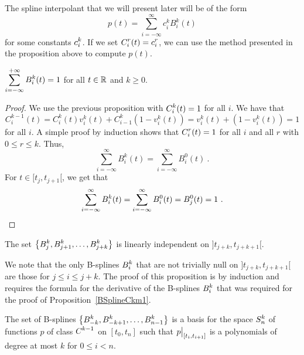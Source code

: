 \begin{rmk}
The spline interpolant that we will present later will be
of the form
\[
  p(t) = \sum_{i=-\infty}^\infty  c_i^k B_i^k(t)
\]
for some constants $\displaystyle c_i^k$.  If we set
$\displaystyle C_i^r(t) = c_i^r$, we can use
the method presented in the proposition above to compute $p(t)$.
\end{rmk}

\begin{prop}
$\displaystyle \sum_{i=-\infty}^{+\infty} B_i^k(t) = 1$ for all $t \in \mathbb{R}$
and $k\geq 0$.
\label{Bsplinesum1}
\end{prop}

\begin{proof}
We use the previous proposition with $\displaystyle C_i^k(t) = 1$ for
all $i$.  We have that
\[
C_i^{k-1}(t) = C_i^k(t) v_i^k(t) + C_{i-1}^k \left( 1- v_i^k(t)\right)
=  v_i^k(t) + \left( 1-  v_i^k(t)\right) = 1
\]
for all $i$.   A simple proof by induction shows that
$\displaystyle C_i^r(t) = 1$ for all $i$ and all $r$ with
$0 \leq r \leq k$.  Thus,
\[
  \sum_{i=-\infty}^\infty B_i^k(t) = \sum_{i=-\infty}^\infty B_i^0(t) \ .
\]
For $t\in [t_j,t_{j+1}[$, we get that
\[
  \sum_{i=-\infty}^\infty B_i^k(t) = \sum_{i=-\infty}^\infty B_i^0(t)
  = B_j^0(t) = 1 \ .  \qedhere
\]
\end{proof}

\begin{prop}
The set
$\displaystyle \left\{ B_j^k, B_{j+1}^k, \ldots , B_{j+k}^k \right\}$
is linearly independent on $]t_{j+k},t_{j+k+1}[$.
\end{prop}

We note that the only B-splines $\displaystyle B_i^k$ that are not
trivially null on $]t_{j+k},t_{j+k+1}[$ are those for
$j \leq i \leq j+k$.  The proof of
this proposition is by induction and requires the formula for the
derivative of the B-splines $\displaystyle B_i^k$ that was required
for the proof of Proposition~\ref{BSplineCkm1}.

\begin{prop}
The set of B-splines
$\displaystyle \left\{ B_{-k}^k, B_{-k+1}^k, \ldots , B_{n-1}^k \right\}$
is a basis for the space $\displaystyle S_n^k$ of functions $p$ of
class $\displaystyle C^{k-1}$ on $[t_0,t_n]$ such that
$\displaystyle p\big|_{[t_i,t_{i+1}]}$ is a polynomials of degree at most
$k$ for $0\leq i < n$.
\label{BSplineLinInd}
\end{prop}

